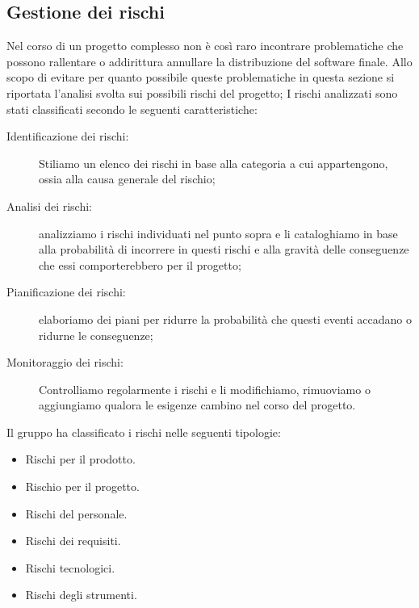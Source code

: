 \documentclass[../piano-di-progetto.tex]{subfiles}
\begin{document}
	\subsection{Gestione dei rischi}%
  \label{sub:gestione_dei_rischi}
  Nel corso di un progetto complesso non è così raro incontrare problematiche che possono rallentare o addirittura annullare la distribuzione del software finale.
  Allo scopo di evitare per quanto possibile queste problematiche in questa sezione si riportata l'analisi svolta sui possibili rischi del progetto; I rischi analizzati sono stati classificati secondo le seguenti caratteristiche:
  \begin{description}
      \item[Identificazione dei rischi:] Stiliamo un elenco dei rischi in base alla categoria a cui appartengono, ossia alla causa generale del rischio;
      \item[Analisi dei rischi:] analizziamo i rischi individuati nel punto sopra e li cataloghiamo in base alla probabilità di incorrere in questi rischi e alla gravità delle conseguenze che essi comporterebbero per il progetto;
      \item[Pianificazione dei rischi:] elaboriamo dei piani per ridurre la probabilità che questi eventi accadano o ridurne le conseguenze;
      \item[Monitoraggio dei rischi:] Controlliamo regolarmente i rischi e li modifichiamo, rimuoviamo o aggiungiamo qualora le esigenze cambino nel corso del progetto.
    \end{description}
    Il gruppo ha classificato i rischi nelle seguenti tipologie:
    \begin{itemize}
      \item Rischi per il prodotto.
      \item Rischio per il progetto.
      \item Rischi del personale.
      \item Rischi dei requisiti.
      \item Rischi tecnologici.
      \item Rischi degli strumenti.
    \end{itemize}
\end{document}
